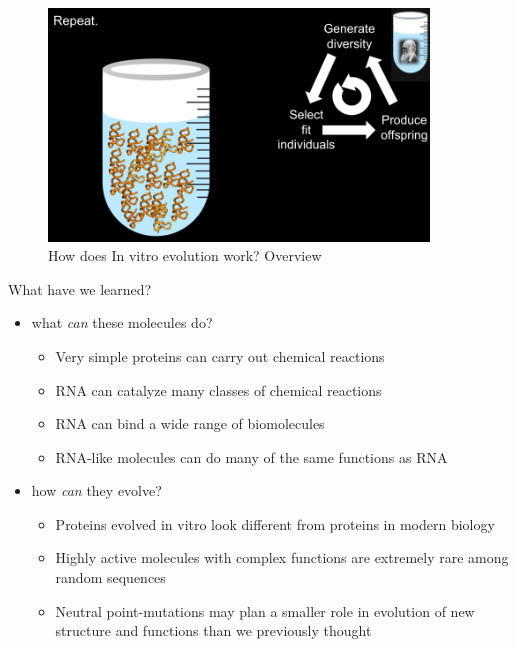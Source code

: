 \documentclass[]{article}
\begin{document}
\begin{figure}[H]
	\caption{How does In vitro evolution work? Overview}\label{fig:InVitroEvolutionRepeat}
	\includegraphics[width=0.9\textwidth]{InVitroEvolutionRepeat}
\end{figure}

What have we learned?
\begin{itemize}
	\item what \textit{can} these molecules do?
	\begin{itemize}
		\item Very simple proteins can carry out chemical reactions\cite{seelig2007selection}
		\item RNA can catalyze many classes of chemical reactions\cite{chen2007ribozyme}
		\item RNA can bind a wide range of biomolecules\cite{gold2012aptamers}
		\item RNA-like molecules can do many of the same functions as RNA\cite{sefah2014vitro} \cite{pinheiro2012synthetic}
	\end{itemize}
	\item how \textit{can} they evolve?
		\begin{itemize}
		\item Proteins evolved in vitro look different from proteins in modern biology\cite{mansy2007structure}
		\item Highly active molecules with complex functions are extremely rare among random sequences \cite{bartel1993isolation}
		\item Neutral point-mutations may plan a smaller role in evolution of new structure and functions than we previously thought\cite{petrie2014limits} \cite{pressman2019mapping}
	\end{itemize}
\end{itemize}
\end{document}
